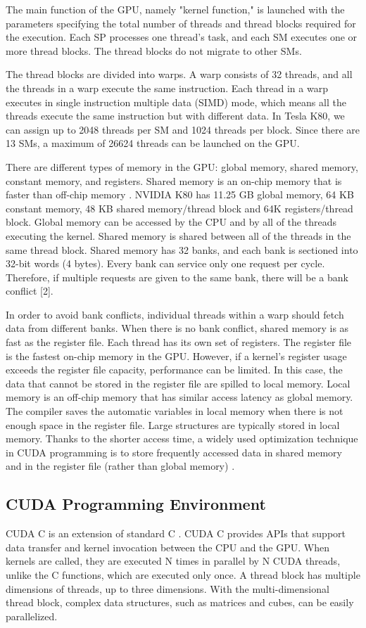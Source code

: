 The main function of the GPU, namely "kernel function," is launched with the parameters specifying the total number of threads and thread blocks required for the execution. Each SP processes one thread's task, and each SM executes one or more thread blocks. The thread blocks do not migrate to other SMs.

The thread blocks are divided into warps. A warp consists of 32 threads, and all the threads in a warp execute the same instruction. Each thread in a warp executes in single instruction multiple data (SIMD) mode, which means all the threads execute the same instruction but with different data. In Tesla K80, we can assign up to 2048 threads per SM and 1024 threads per block. Since there are 13 SMs, a maximum of 26624 threads can be launched on the GPU.

There are different types of memory in the GPU: global memory, shared memory, constant memory, and registers. Shared memory is an on-chip memory that is faster than off-chip memory \cite{bib8}. NVIDIA K80 has 11.25 GB global memory, 64 KB constant memory, 48 KB shared memory/thread block and 64K registers/thread block. Global memory can be accessed by the CPU and by all of the threads executing the kernel. Shared memory is shared between all of the threads in the same thread block. Shared memory has 32 banks, and each bank is sectioned into 32-bit words (4 bytes). Every bank can service only one request per cycle. Therefore, if multiple requests are given to the same bank, there will be a bank conflict [2].

In order to avoid bank conflicts, individual threads within a warp should fetch data from different banks. When there is no bank conflict, shared memory is as fast as the register file. Each thread has its own set of registers. The register file is the fastest on-chip memory in the GPU. However, if a kernel's register usage exceeds the register file capacity, performance can be limited. In this case, the data that cannot be stored in the register file are spilled to local memory. Local memory is an off-chip memory that has similar access latency as global memory. The compiler saves the automatic variables in local memory when there is not enough space in the register file. Large structures are typically stored in local memory. Thanks to the shorter access time, a widely used optimization technique in CUDA programming is to store frequently accessed data in shared memory and in the register file (rather than global memory) \cite{bib14}.

\subsection{CUDA Programming Environment}
CUDA C is an extension of standard C \cite{bib5}. CUDA C provides APIs that support data transfer and kernel invocation between the CPU and the GPU. When kernels are called, they are executed N times in parallel by N CUDA threads, unlike the C functions, which are executed only once. A thread block has multiple dimensions of threads, up to three dimensions. With the multi-dimensional thread block, complex data structures, such as matrices and cubes, can be easily parallelized.

